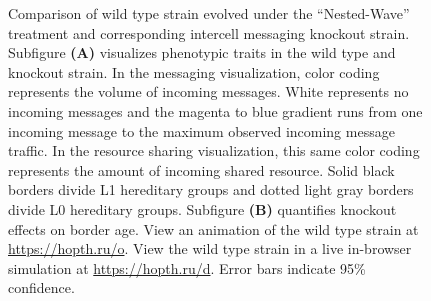 \begin{figure}[!htbp]
\begin{center}
\begin{minipage}[t]{0.5\linewidth}
\end{minipage}

\caption{
Comparison of wild type strain evolved under the ``Nested-Wave'' treatment and corresponding intercell messaging knockout strain.
Subfigure \textbf{(A)} visualizes phenotypic traits in the wild type and knockout strain.
In the messaging visualization, color coding represents the volume of incoming messages.
White represents no incoming messages and the magenta to blue gradient runs from one incoming message to the maximum observed incoming message traffic.
In the resource sharing visualization, this same color coding represents the amount of incoming shared resource.
Solid black borders divide L1 hereditary groups and dotted light gray borders divide L0 hereditary groups.
Subfigure \textbf{(B)} quantifies knockout effects on border age.
View an animation of the wild type strain at \url{https://hopth.ru/o}.
View the wild type strain in a live in-browser simulation at \url{https://hopth.ru/d}.
Error bars indicate 95\% confidence.
}
\label{fig:ko-intermessaging-intergroup_border}

\end{center}
\end{figure}
